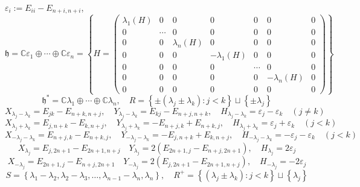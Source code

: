 \documentclass[reqno]{amsart} 
\def\eps{\varepsilon}
\begin{document}
$\eps_i := E_{i i} - E_{n+i,n+i}$,
\begin{equation*}
  \mathfrak{h} = \mathbb{C} \eps_1 \oplus \dotsb \oplus \mathbb{C} \eps_n = \left\{ H = 
\begin{pmatrix}
    \lambda_1(H) & 0 & 0 & 0 & 0 & 0 & 0  \\
    0 & \dotsb & 0 & 0 & 0 & 0 & 0  \\
    0 & 0 & \lambda_n(H) & 0 & 0 & 0 & 0  \\
    0 & 0 & 0 & -\lambda_1(H) & 0 & 0 & 0 \\
    0 & 0 & 0 & 0 & \dotsb & 0 & 0 \\
    0 & 0 & 0 & 0 & 0 & -\lambda_n(H) & 0  \\
    0 & 0 & 0 & 0 & 0 & 0 & 0
  \end{pmatrix}
\right\}
\end{equation*}
\begin{equation*}
  \mathfrak{h}^* = \mathbb{C} \lambda_1 \oplus \dotsb \oplus \mathbb{C} \lambda_n, \quad R = \left\{ \pm (\lambda_j \pm \lambda_k) : j < k \right\} \sqcup \left\{ \pm \lambda_j \right\}
\end{equation*}
\begin{equation*}
  X_{\lambda_j - \lambda_k} = E_{j k} - E_{n+k,n+j}, \quad Y_{\lambda_j - \lambda_k} = E_{k j} - E_{n+j,n+k}, \quad H_{\lambda_j - \lambda_k} = \eps_j - \eps_k \quad (j \neq k)
\end{equation*}
\begin{equation*}
  X_{\lambda_j + \lambda_k} = E_{j,n+k} - E_{k,n+j}, \quad Y_{\lambda_j + \lambda_k} = - E_{n+j, k} + E_{n+k,j}, \quad H_{\lambda_j + \lambda_k} = \eps_j + \eps_k \quad (j < k)
\end{equation*}
\begin{equation*}
  X_{-\lambda_j - \lambda_k} = E_{n+j,k} - E_{n+k,j}, \quad Y_{-\lambda_j - \lambda_k} = -E_{j, n+k} + E_{k,n+j}, \quad H_{-\lambda_j - \lambda_k} = -\eps_j - \eps_k \quad (j < k)
\end{equation*}
\begin{equation*}
  X_{\lambda_j} = E_{j,2 n + 1} - E_{2n+1,n+j} \quad Y_{\lambda_j} = 2(E_{2 n + 1,j} - E_{n+j,2n+1}), \quad H_{\lambda_j} = 2 \eps_j
\end{equation*}
\begin{equation*}
  X_{-\lambda_j} = E_{2 n + 1,j} - E_{n+j,2n+1} \quad Y_{-\lambda_j} = 2(E_{j,2 n + 1} - E_{2n+1,n+j}), \quad H_{-\lambda_j} = -2 \eps_j
\end{equation*}
\begin{equation*}
  S = \left\{ \lambda_1 - \lambda_2, \lambda_2 - \lambda_3, \dotsc, \lambda_{n-1} - \lambda_n, \lambda_n \right\}, \quad R^+ = \left\{ (\lambda_j \pm \lambda_k) : j < k \right\} \sqcup \left\{ \lambda_j \right\}
\end{equation*}
\end{document}
